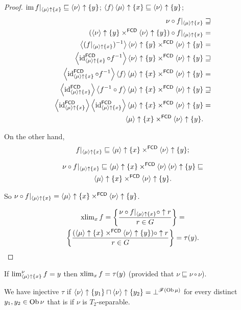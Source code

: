 \begin{proof}
$\operatorname{im} f|_{\left\langle \mu\right\rangle\uparrow\{x\}}\sqsubseteq\left\langle \nu\right\rangle\uparrow\{y\}$;
$\left\langle f\right\rangle\left\langle \mu\right\rangle\uparrow\{x\}\sqsubseteq\left\langle \nu\right\rangle\uparrow\{y\}$;
\begin{align*}
\nu\circ f|_{\left\langle \mu\right\rangle\uparrow\{x\}} & \sqsupseteq\\
(\left\langle \nu\right\rangle\uparrow\{y\}\times^{\mathsf{FCD}}\left\langle \nu\right\rangle\uparrow\{y\})\circ f|_{\left\langle \mu\right\rangle\uparrow\{x\}} & =\\
\left\langle (f|_{\left\langle \mu\right\rangle\uparrow\{x\}})^{-1}\right\rangle\left\langle \nu\right\rangle\uparrow\{y\}\times^{\mathsf{FCD}}\left\langle \nu\right\rangle\uparrow\{y\} & =\\
\left\langle \operatorname{id}_{\left\langle \mu\right\rangle\uparrow\{x\}}^{\mathsf{FCD}}\circ f^{-1}\right\rangle\left\langle \nu\right\rangle\uparrow\{y\}\times^{\mathsf{FCD}}\left\langle \nu\right\rangle\uparrow\{y\} & \sqsupseteq\\
\left\langle \operatorname{id}_{\left\langle \mu\right\rangle\uparrow\{x\}}^{\mathsf{FCD}}\circ f^{-1}\right\rangle\left\langle f\right\rangle\left\langle \mu\right\rangle\uparrow\{x\}\times^{\mathsf{FCD}}\left\langle \nu\right\rangle\uparrow\{y\} & =\\
\left\langle \operatorname{id}_{\left\langle \mu\right\rangle\uparrow\{x\}}^{\mathsf{FCD}}\right\rangle\left\langle f^{-1}\circ f\right\rangle\left\langle \mu\right\rangle\uparrow\{x\}\times^{\mathsf{FCD}}\left\langle \nu\right\rangle\uparrow\{y\} & \sqsupseteq\\
\left\langle \operatorname{id}_{\left\langle \mu\right\rangle\uparrow\{x\}}^{\mathsf{FCD}}\right\rangle\left\langle \operatorname{id}_{\left\langle \mu\right\rangle\uparrow\{x\}}^{\mathsf{FCD}}\right\rangle\left\langle \mu\right\rangle\uparrow\{x\}\times^{\mathsf{FCD}}\left\langle \nu\right\rangle\uparrow\{y\} & =\\
\left\langle \mu\right\rangle\uparrow\{x\}\times^{\mathsf{FCD}}\left\langle \nu\right\rangle\uparrow\{y\}.
\end{align*}

On the other hand, \[ f|_{\left\langle \mu\right\rangle\uparrow\{x\}}\sqsubseteq\left\langle \mu\right\rangle\uparrow\{x\}\times^{\mathsf{FCD}}\left\langle \nu\right\rangle\uparrow\{y\}; \]

\begin{multline*}
\nu\circ f|_{\left\langle \mu\right\rangle\uparrow\{x\}}\sqsubseteq\left\langle \mu\right\rangle\uparrow\{x\}\times^{\mathsf{FCD}}\left\langle \nu\right\rangle\left\langle \nu\right\rangle\uparrow\{y\}\sqsubseteq\\\left\langle \mu\right\rangle\uparrow\{x\}\times^{\mathsf{FCD}}\left\langle \nu\right\rangle\uparrow\{y\}.
\end{multline*}

So $\nu\circ f|_{\left\langle \mu\right\rangle\uparrow\{x\}}=\left\langle \mu\right\rangle\uparrow\{x\}\times^{\mathsf{FCD}}\left\langle \nu\right\rangle\uparrow\{y\}$.

\begin{multline*}
\operatorname{xlim}_{x}f=\left\{ \frac{\nu\circ f|_{\left\langle \mu\right\rangle\uparrow\{x\}}\circ\uparrow r}{r\in G}\right\}=\\ \left\{ \frac{(\left\langle \mu\right\rangle\uparrow\{x\}\times^{\mathsf{FCD}}\left\langle \nu\right\rangle\uparrow\{y\})\circ\uparrow r}{r\in G}\right\}=\tau(y).
\end{multline*}
\end{proof}
\begin{cor}
If $\lim_{\left\langle \mu\right\rangle\uparrow\{x\}}^{\nu}f=y$ then $\operatorname{xlim}_{x}f=\tau(y)$ (provided that $\nu\sqsubseteq\nu\circ\nu$).
\end{cor}
We have injective $\tau$ if $\left\langle \nu\right\rangle\uparrow\{y_{1}\}\sqcap\left\langle \nu\right\rangle\uparrow\{y_{2}\}=\bot^{\mathscr{F}(\operatorname{Ob}\mu)}$
for every distinct $y_{1},y_{2}\in\operatorname{Ob}\nu$ that is if $\nu$ is $T_{2}$-separable.

